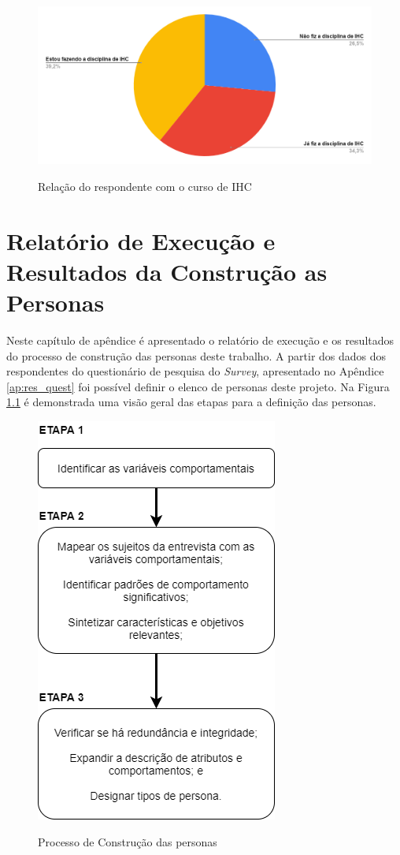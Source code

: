 \begin{apendicesenv}
\begin{figure}[htbp]
	\centering
	\caption{Relação do respondente com o curso de IHC}
	\includegraphics[keepaspectratio=true,scale=0.4]{figuras/apendice/graficos_survey/curso.png}
	\label{Fig:curso.png}
\end{figure}
    
\chapter{Relatório de Execução e Resultados da Construção as Personas}
\label{ap:persona}

{\color{textmodified}
Neste capítulo de apêndice é apresentado o relatório de execução e os resultados do processo de construção das personas deste trabalho. A partir dos dados dos respondentes do questionário de pesquisa do \textit{Survey}, apresentado no Apêndice \ref{ap:res_quest} foi possível definir o elenco de personas deste projeto. Na Figura \ref{Fig:process_persona.png} é demonstrada uma visão geral das etapas para a definição das personas.
}

\begin{figure}[htbp]
	\centering
	\caption{Processo de Construção das personas}
	\includegraphics[keepaspectratio=true,scale=0.8]{figuras/personas/process_persona.png}
	\label{Fig:process_persona.png}
\end{figure}


\end{apendicesenv}
